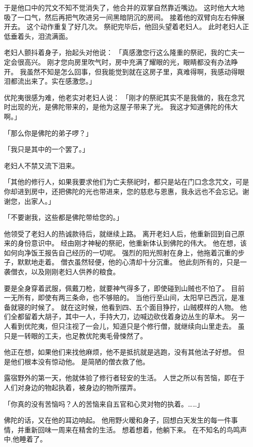\documentclass[twoside,openany]{book}
\begin{document}
于是他口中的咒文不知不觉消失了，他合并的双掌自然靠近嘴边。
这时他大大地吸了一口气，然后再把气吹进另一间黑暗阴沉的房间。
接着他的双臂向左右伸展开去。
这个动作重复了好几次。
祭祀完毕后，他回头望着老妇人。
此时老妇人正低垂着头，泪流满面。

老妇人颤抖着身子，抬起头对他说：
「真感激您行这么隆重的祭祀，我的亡夫一定会很高兴。
刚才您向房里吹气时，房中充满了耀眼的光，眼睛都没有办法睁开。
我虽然不知是怎么回事，但我能觉到就在这房子里，真难得啊，我感动得眼泪都流出来了。实在感激您。」

优陀夷很感为难，他老实对老妇人说：
「刚才的祭祀其实不是我做的，我在念咒时出现的光，是佛陀带来的，是他为这屋子带来了光。
我这才知道佛陀的伟大啊。」

「那么你是佛陀的弟子啰？」

「我只是其中的一个罢了。」

老妇人不禁又流下泪来。

「其他的修行人，如果我要求他们为亡夫祭祀时，都只是站在门口念念咒文，可是你却进到房中，还把佛陀的光也带进来，您的慈悲与恩惠，我永远也不会忘记。谢谢您，出家人。」

「不要谢我，这些都是佛陀带给您的。」

他领受了老妇人的热诚款待后，就继续上路。
离开老妇人后，他重新回到自己原来的身份意识中。
经由刚才神秘的祭祀，他重新体认到佛陀的伟大。
他在想，该如何向净饭王报告自己经历的一切呢。
强烈的阳光照射在身上，他拖着沉重的步子，默默地走着。
僧衣虽然轻便，他的心清却十分沉重。
他此刻所有的，只是一袭僧衣，以及刚刚老妇人供养的粮食。

要是全身穿着武服，佩戴刀枪，就要神气得多了，即使碰到山贼也不怕了。
目前一无所有，即使有两三条命，也不够赔的。
当他行至山间，太阳早已西沉，是准备就寝的时候了。
就在这时候，他看到四、五个面目狰拧，山贼模样的人物。
他们全都留着大胡子，其中一人，手持大刀，边喊边砍伐着身边丛生的草木。
另一人看到优陀夷，但只注视了一会儿，知道只是个修行僧，就继续向山里走去。
虽只是一转眼的工夫，也足教优陀夷毛骨悚然了。

他正在想，如果他们来找他麻烦，他不是抵抗就是逃跑，没有其他法子好想。
但是他们根本没有惊动他。
是简陋的僧衣救了他。

露宿野外的第一天，他就体验了修行者轻安的生活。
人世之所以有苦恼，即在于人们对身边的物起执着，被身边的物所摆弄。

「你真的没有苦恼吗？人的苦恼来自五官和心灵对物的执着。……」

佛陀的话，又在他的耳边响起。
他用野火暧和身子，回想白天发生的每一件事情，并重新回味一周来在精舍的生活。
想着想着，他躺下来。
在不知名的鸟鸣声中,他睡着了。
\end{document}
